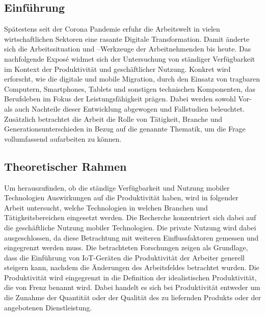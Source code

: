 \documentclass[12pt,a4paper]{article}
\title{\titlename}
\author{Reichard, Pia~~~Berger, Vivian~~~Engelhard, Phillib~~~Müller, Maximilian}
\date{\exposedate}
\begin{document}

\maketitle
\newpage

\subsection*{Einführung }
Spätestens seit der Corona Pandemie erfuhr die Arbeitswelt in vielen wirtschaftlichen Sektoren eine rasante Digitale Transformation. Damit änderte sich die Arbeitssituation und –Werkzeuge der Arbeitnehmenden bis heute. Das nachfolgende Exposé widmet sich der Untersuchung von ständiger Verfügbarkeit im Kontext der Produktivität und geschäftlicher Nutzung. Konkret wird erforscht, wie die digitale und mobile Migration, durch den Einsatz von tragbaren Computern, Smartphones, Tablets und sonstigen technischen Komponenten, das Berufsleben im Fokus der Leistungsfähigkeit prägen. Dabei werden sowohl Vor- als auch Nachteile dieser Entwicklung abgewogen und Fallstudien beleuchtet. Zusätzlich betrachtet die Arbeit die Rolle von Tätigkeit, Branche und Generationsunterschieden in Bezug auf die genannte Thematik, um die Frage vollumfassend aufarbeiten zu können.

\subsection*{Theoretischer Rahmen}
Um herauszufinden, ob die ständige Verfügbarkeit und Nutzung mobiler Technologien Auswirkungen auf die Produktivität haben, wird in folgender Arbeit untersucht, welche Technologien in welchen Branchen und Tätigkeitsbereichen eingesetzt werden. 
Die Recherche konzentriert sich dabei auf die geschäftliche Nutzung mobiler Technologien.  
Die private Nutzung wird dabei ausgeschlossen, da diese Betrachtung mit weiteren Einflussfaktoren gemessen und eingegrenzt werden muss.
Die betrachteten Forschungen zeigen als Grundlage, dass die Einführung von IoT-Geräten die Produktivität der Arbeiter generell steigern kann, nachdem die Änderungen des Arbeitsfeldes betrachtet wurden.
Die Produktivität wird eingegrenzt in die Definition der idealistischen Produktivität, die von Frenz benannt wird.
Dabei handelt es sich bei Produktivität entweder um die Zunahme der Quantität oder der Qualität des zu liefernden Produkts oder der angebotenen Dienstleistung. 
\end{document}
